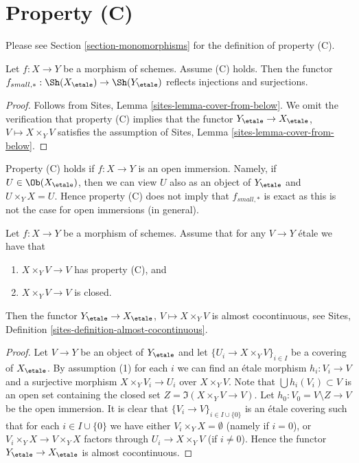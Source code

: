 \section{Property (C)}
\label{section-C}

\noindent
Please see Section \ref{section-monomorphisms} for the definition of property
(C).

\begin{lemma}
\label{lemma-property-C-implies}
Let $f : X \to Y$ be a morphism of schemes. Assume (C) holds. Then the functor
$f_{small, *} :
\Sh(X_\etale)
\to
\Sh(Y_\etale)$
reflects injections and surjections.
\end{lemma}

\begin{proof}
Follows from
Sites, Lemma \ref{sites-lemma-cover-from-below}.
We omit the verification that property (C) implies that the functor
$Y_\etale \to X_\etale$, $V \mapsto X \times_Y V$
satisfies the assumption of
Sites, Lemma \ref{sites-lemma-cover-from-below}.
\end{proof}

\begin{remark}
\label{remark-property-C-strong}
Property (C) holds if $f : X \to Y$ is an open immersion. Namely, if
$U \in \Ob(X_\etale)$, then we can view $U$ also as an object
of $Y_\etale$ and $U \times_Y X = U$. Hence property (C)
does not imply that $f_{small, *}$ is exact as this is not
the case for open immersions (in general).
\end{remark}

\begin{lemma}
\label{lemma-property-C-closed-implies}
Let $f : X \to Y$ be a morphism of schemes. Assume that
for any $V \to Y$ \'etale we have that
\begin{enumerate}
\item $X \times_Y V \to V$ has property (C), and
\item $X \times_Y V \to V$ is closed.
\end{enumerate}
Then the functor
$Y_\etale \to X_\etale$, $V \mapsto X \times_Y V$
is almost cocontinuous, see
Sites, Definition \ref{sites-definition-almost-cocontinuous}.
\end{lemma}

\begin{proof}
Let $V \to Y$ be an object of $Y_\etale$ and let
$\{U_i \to X \times_Y V\}_{i \in I}$ be a covering of $X_\etale$.
By assumption (1) for each $i$ we can find an \'etale morphism
$h_i : V_i \to V$ and a surjective morphism $X \times_Y V_i \to U_i$
over $X \times_Y V$. Note that $\bigcup h_i(V_i) \subset V$ is an
open set containing the closed set $Z = \Im(X \times_Y V \to V)$.
Let $h_0 : V_0 = V \setminus Z \to V$ be the open immersion.
It is clear that $\{V_i \to V\}_{i \in I \cup \{0\}}$ is an
\'etale covering such that for each $i \in I \cup \{0\}$ we have
either $V_i \times_Y X = \emptyset$ (namely if $i = 0$), or
$V_i \times_Y X \to V \times_Y X$ factors through $U_i \to X \times_Y V$
(if $i \not = 0$). Hence the functor $Y_\etale \to X_\etale$
is almost cocontinuous.
\end{proof}

